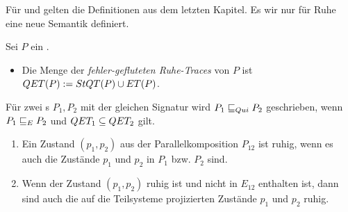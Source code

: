 Für \ET{} und \EL{} gelten die Definitionen aus dem letzten Kapitel. Es wir nur
für Ruhe eine neue Semantik definiert.

\begin{Def}
  Sei $P$ ein \MEIO{}.
  \begin{itemize}
    \item Die Menge der \emph{fehler-gefluteten Ruhe-Traces} von $P$ ist $QET
      (P):= StQT (P)\cup ET (P)$.
  \end{itemize}
  Für zwei \MEIO{}s $P_1,P_2$ mit der gleichen Signatur wird $P_1 \sqsubseteq  _{Qui}{} P_2$
  geschrieben, wenn $P_1 \sqsubseteq  _E{} P_2$ und $QET _1\subseteq QET _2$ gilt.
\end{Def}

\begin{Lem}\mbox{}
  \begin{enumerate}
    \item Ein Zustand $(p_1,p_2)$ aus der Parallelkomposition $P_{12}$ ist
      ruhig, wenn es auch die Zustände $p_1$ und $p_2$ in $P_1$ bzw. $P_2$
      sind.
    \item Wenn der Zustand $(p_1,p_2)$ ruhig ist und nicht in $E_{12}$
      enthalten ist, dann sind auch die auf die Teilsysteme projizierten
      Zustände $p_1$ und $p_2$ ruhig.\\
  \end{enumerate}
\end{Lem}
